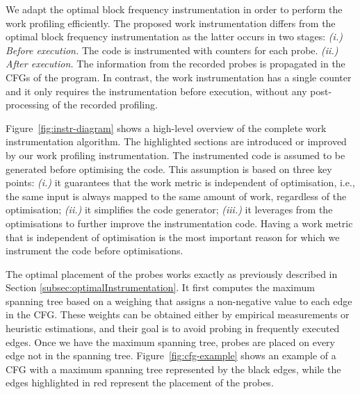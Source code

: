 We adapt the optimal block frequency instrumentation in order to perform the work profiling efficiently.
The proposed work instrumentation differs from the optimal block frequency instrumentation as the latter occurs in two stages:
\textit{(i.) Before execution.} The code is instrumented with counters for each probe.
\textit{(ii.) After execution.} The information from the recorded probes is propagated in the CFGs of the program.
In contrast, the work instrumentation has a single counter and it only requires the instrumentation before execution, without any post-processing of the recorded profiling.

Figure~\ref{fig:instr-diagram} shows a high-level overview of the complete work instrumentation algorithm.
The highlighted sections are introduced or improved by our work profiling  instrumentation.
The instrumented code is assumed to be generated before optimising the code.
This assumption is based on three key points:
\textit{(i.)} it guarantees that the work metric is independent of optimisation, i.e., the same input is always mapped to the same amount of work, regardless of the optimisation;
\textit{(ii.)} it simplifies the code generator;
\textit{(iii.)} it leverages from the optimisations to further improve the instrumentation code.
Having a work metric that is independent of optimisation is the most important reason for which we instrument the code before optimisations.

The optimal placement of the probes works exactly as previously described in Section \ref{subsec:optimalInstrumentation}.
It first computes the maximum spanning tree based on a weighing that assigns a non-negative value to each edge in the CFG.
These weights can be obtained either by empirical measurements or heuristic estimations, and their goal is to avoid probing in frequently executed edges.
Once we have the maximum spanning tree, probes are placed on every edge not in the spanning tree.
Figure~\ref{fig:cfg-example} shows an example of a CFG with a maximum spanning tree represented by the black edges, while the edges highlighted in red represent the placement of the probes.

